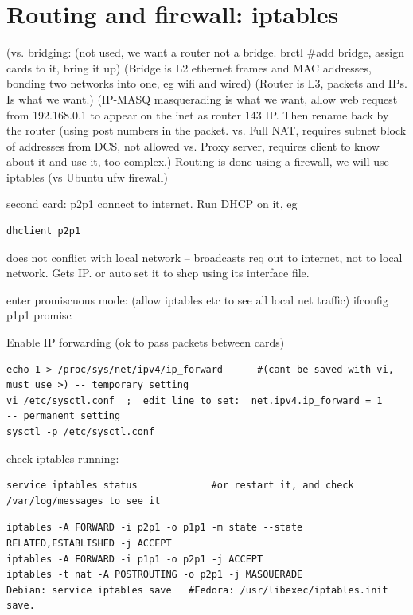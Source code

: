 \documentclass[oneside,english]{scrbook}
\begin{document}
\section{Routing and firewall: iptables}

 (vs. bridging: (not used, we want a router not a bridge.  brctl    #add bridge, assign cards to it, bring it up)
 (Bridge is L2 ethernet frames and MAC addresses, bonding two networks into one, eg wifi and wired)
 (Router is L3, packets and IPs. Is what we want.)
 (IP-MASQ masquerading is what we want, allow web request from 192.168.0.1 to appear on the inet as router 143 IP. Then rename back by the router (using post numbers in the packet.
   vs. Full NAT, requires subnet  block of addresses from DCS, not allowed
   vs. Proxy server, requires client to know about it and use it, too complex.)
  Routing is done using a firewall, we will use iptables   (vs Ubuntu ufw firewall)

second card: p2p1 connect to internet.   Run DHCP on it, eg
\begin{lstlisting}
dhclient p2p1
\end{lstlisting}
does not conflict with local network -- broadcasts req out to internet, not to local network. Gets IP.
or auto set it to shcp using its interface file.

enter promiscuous mode: (allow iptables etc to see all local net traffic)
ifconfig p1p1 promisc

Enable IP forwarding (ok to pass packets between cards)
\begin{lstlisting}
echo 1 > /proc/sys/net/ipv4/ip_forward      #(cant be saved with vi, must use >) -- temporary setting
vi /etc/sysctl.conf  ;  edit line to set:  net.ipv4.ip_forward = 1    -- permanent setting
sysctl -p /etc/sysctl.conf
\end{lstlisting}

check iptables running:
\begin{lstlisting}
service iptables status             #or restart it, and check /var/log/messages to see it
\end{lstlisting}

\begin{lstlisting}
iptables -A FORWARD -i p2p1 -o p1p1 -m state --state RELATED,ESTABLISHED -j ACCEPT
iptables -A FORWARD -i p1p1 -o p2p1 -j ACCEPT
iptables -t nat -A POSTROUTING -o p2p1 -j MASQUERADE
Debian: service iptables save   #Fedora: /usr/libexec/iptables.init save.
\end{lstlisting}
\end{document}
